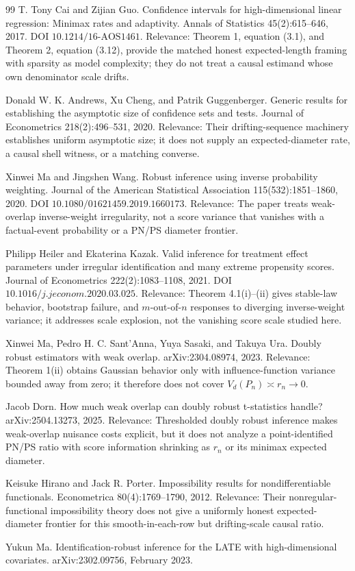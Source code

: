 \documentclass{article}
\begin{document}
\begin{thebibliography}{99}
   T. Tony Cai and Zijian Guo. Confidence intervals for high-dimensional linear regression: Minimax rates and adaptivity. Annals of Statistics 45(2):615--646, 2017. DOI \(10.1214/16\text{-}\mathrm{AOS}1461\). Relevance: Theorem 1, equation (3.1), and Theorem 2, equation (3.12), provide the matched honest expected-length framing with sparsity as model complexity; they do not treat a causal estimand whose own denominator scale drifts.

   Donald W. K. Andrews, Xu Cheng, and Patrik Guggenberger. Generic results for establishing the asymptotic size of confidence sets and tests. Journal of Econometrics 218(2):496--531, 2020. Relevance: Their drifting-sequence machinery establishes uniform asymptotic size; it does not supply an expected-diameter rate, a causal shell witness, or a matching converse.

   Xinwei Ma and Jingshen Wang. Robust inference using inverse probability weighting. Journal of the American Statistical Association 115(532):1851--1860, 2020. DOI \(10.1080/01621459.2019.1660173\). Relevance: The paper treats weak-overlap inverse-weight irregularity, not a score variance that vanishes with a factual-event probability or a PN/PS diameter frontier.

   Philipp Heiler and Ekaterina Kazak. Valid inference for treatment effect parameters under irregular identification and many extreme propensity scores. Journal of Econometrics 222(2):1083--1108, 2021. DOI \(10.1016/j.jeconom.2020.03.025\). Relevance: Theorem 4.1(i)--(ii) gives stable-law behavior, bootstrap failure, and \(m\)-out-of-\(n\) responses to diverging inverse-weight variance; it addresses scale explosion, not the vanishing score scale studied here.

   Xinwei Ma, Pedro H. C. Sant'Anna, Yuya Sasaki, and Takuya Ura. Doubly robust estimators with weak overlap. arXiv:2304.08974, 2023. Relevance: Theorem 1(ii) obtains Gaussian behavior only with influence-function variance bounded away from zero; it therefore does not cover \(V_d(P_n)\asymp r_n\to0\).

   Jacob Dorn. How much weak overlap can doubly robust t-statistics handle? arXiv:2504.13273, 2025. Relevance: Thresholded doubly robust inference makes weak-overlap nuisance costs explicit, but it does not analyze a point-identified PN/PS ratio with score information shrinking as \(r_n\) or its minimax expected diameter.

   Keisuke Hirano and Jack R. Porter. Impossibility results for nondifferentiable functionals. Econometrica 80(4):1769--1790, 2012. Relevance: Their nonregular-functional impossibility theory does not give a uniformly honest expected-diameter frontier for this smooth-in-each-row but drifting-scale causal ratio.

   Yukun Ma. Identification-robust inference for the LATE with high-dimensional covariates. arXiv:2302.09756, February 2023.

\end{thebibliography}
\end{document}
